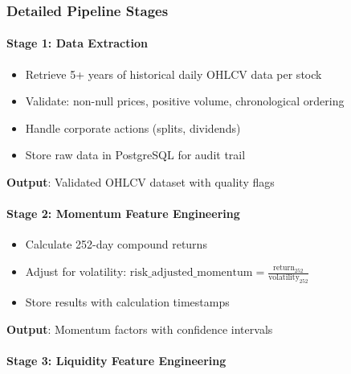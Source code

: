 \documentclass[11pt, a4paper, twoside]{article}
\begin{document}
\begin{figure}[H]
\end{figure}

\subsubsection{Detailed Pipeline Stages}

\paragraph{Stage 1: Data Extraction}

\begin{itemize}
    \item Retrieve 5+ years of historical daily OHLCV data per stock
    \item Validate: non-null prices, positive volume, chronological ordering
    \item Handle corporate actions (splits, dividends)
    \item Store raw data in PostgreSQL for audit trail
\end{itemize}

\textbf{Output}: Validated OHLCV dataset with quality flags

\paragraph{Stage 2: Momentum Feature Engineering}

\begin{itemize}
    \item Calculate 252-day compound returns
    \item Adjust for volatility: $\text{risk\_adjusted\_momentum} = \frac{\text{return}_{252}}{\text{volatility}_{252}}$
    \item Store results with calculation timestamps
\end{itemize}

\textbf{Output}: Momentum factors with confidence intervals

\paragraph{Stage 3: Liquidity Feature Engineering}
\end{document}
